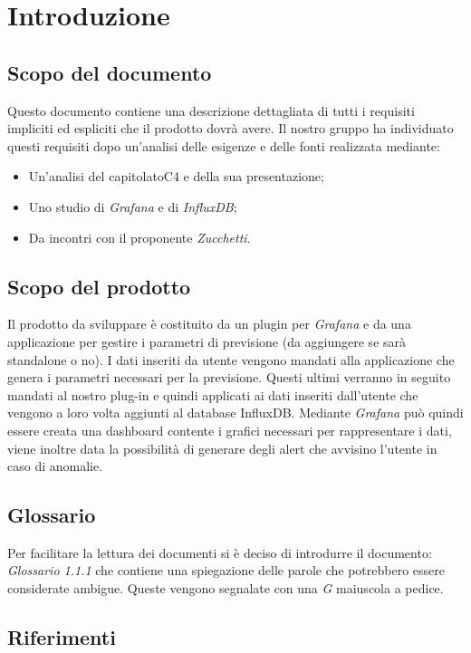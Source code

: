 
\section{Introduzione}
	\subsection{Scopo del documento}
	Questo documento contiene una descrizione dettagliata di tutti i requisiti impliciti ed espliciti che il prodotto dovrà avere. Il nostro gruppo ha individuato questi requisiti dopo un'analisi delle esigenze e delle fonti realizzata mediante: 
	\begin{itemize}
		\item Un'analisi del capitolato\glosp C4 e della sua presentazione; 
		\item Uno studio di \textit{Grafana\glosp} e di \textit{InfluxDB};
		\item Da incontri con il proponente \textit{Zucchetti}.
	\end{itemize}
	\subsection{Scopo del prodotto}
	Il prodotto da sviluppare è costituito da un plugin per \textit{Grafana} e da una applicazione per gestire i parametri di previsione (da aggiungere se sarà standalone o no). I dati inseriti da utente vengono mandati alla applicazione che genera i parametri necessari per la previsione. Questi ultimi verranno in seguito mandati al nostro plug-in e quindi applicati ai dati inseriti dall'utente che vengono a loro volta aggiunti al database InfluxDB. Mediante \textit{Grafana} può quindi essere creata una dashboard contente i grafici necessari per rappresentare i dati, viene inoltre data la possibilità di generare degli alert che avvisino l'utente in caso di anomalie.
		
	\subsection{Glossario}
	Per facilitare la lettura dei documenti si è deciso di introdurre il documento: \textit{Glossario 1.1.1} che contiene una spiegazione delle parole che potrebbero essere considerate ambigue. Queste vengono segnalate con una \textit{G} maiuscola a pedice.  
	\subsection{Riferimenti}
